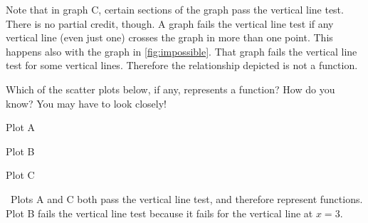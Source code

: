 Note that in graph C, certain sections of the graph pass the vertical line test. There is no partial credit, though. A graph fails the vertical line test if any vertical line (even just one) crosses the graph in more than one point. This happens also with the graph in \cref{fig:impossible}. That graph fails the vertical line test for some vertical lines. Therefore the relationship depicted is not a function.

\begin{boxex}
Which of the scatter plots below, if any, represents a function? How do you know? You may have to look closely!

\begin{minipage}{0.33\textwidth}
\centering
Plot A
\par{}
\end{minipage}
\begin{minipage}{0.33\textwidth}
\centering
Plot B
\par{}
\end{minipage}
\begin{minipage}{0.33\textwidth}
\centering
Plot C
\par{}
\end{minipage}

\exsoln\ Plots A and C both pass the vertical line test, and therefore represent functions. Plot B fails the vertical line test because it fails for the vertical line at $x=3$.
\end{boxex}

